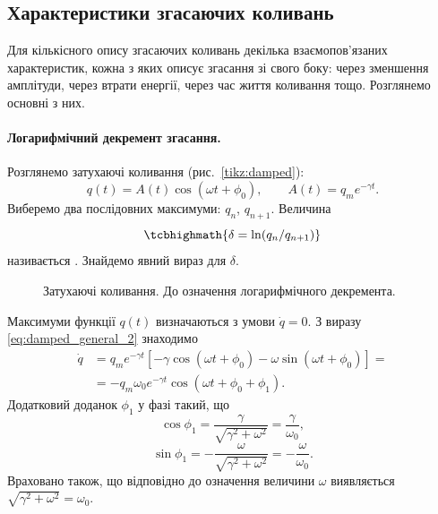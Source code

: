 \subsection*{Характеристики згасаючих коливань}

Для кількісного опису згасаючих коливань декілька взаємопов'язаних характеристик, кожна з яких описує згасання зі свого боку: через зменшення амплітуди, через втрати енергії, через час життя коливання тощо. Розглянемо основні з них.

\paragraph*{Логарифмічний декремент згасання.}
Розглянемо затухаючі коливання (рис.~\ref{tikz:damped}):
\begin{equation}\label{eq:damped_general_2}
	q(t) = A(t)\cos(\omega t + \phi_0), \qquad A(t) = q_m e^{-\gamma t}.
\end{equation}
Виберемо два послідовних максимуми: $q_n$, $q_{n+1}$. Величина
\begin{equation}\label{eq:log_decrement}
	\tcbhighmath{
		\delta = \ln(q_n / q_{n+1})
	}
\end{equation}
називається . Знайдемо явний вираз
для $\delta$.

\begin{figure}[h!]
	\centering
{}
	\caption{Затухаючі коливання. До означення логарифмічного декремента.}
	\label{tikz:log_decrement}
\end{figure}

Максимуми функції $q(t)$ визначаються з умови $\dot{q} = 0$. З виразу \eqref{eq:damped_general_2} знаходимо
\begin{equation}\label{eq:derivative_maxima}
	\begin{aligned}
		\dot{q} & = q_m e^{-\gamma t}\left[-\gamma \cos(\omega t + \phi_0) - \omega \sin(\omega t + \phi_0)\right] = \\
		        & = -q_m \omega_0 e^{-\gamma t} \cos(\omega t + \phi_0 + \phi_1).
	\end{aligned}
\end{equation}
Додатковий доданок $\phi_1$ у фазі такий, що
\begin{equation}\label{eq:varphi1}
	\cos\phi_1 = \frac{\gamma}{\sqrt{\gamma^2 + \omega^2}} = \frac{\gamma}{\omega_0},
\end{equation}
\begin{equation}\label{eq:varphi1_sin}
	\sin\phi_1 = -\frac{\omega}{\sqrt{\gamma^2 + \omega^2}} = -\frac{\omega}{\omega_0}.
\end{equation}
Враховано також, що відповідно до означення величини $\omega$ виявляється $\sqrt{\gamma^2 + \omega^2} = \omega_0$.

